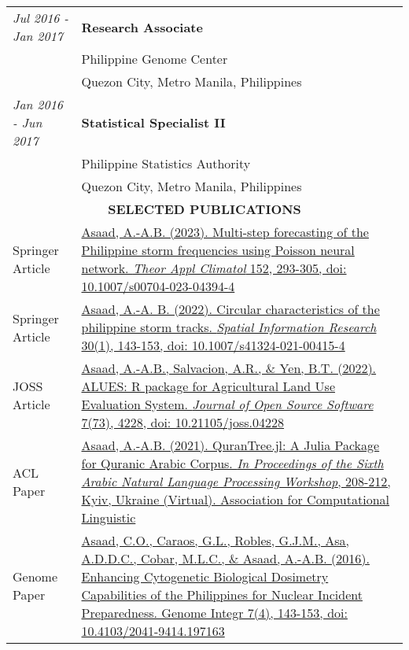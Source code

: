 \begin{tabular}{lp{10.3cm}}
    \textit{Jul 2016 - Jan 2017}& \textbf{Research Associate}\\
    & Philippine Genome Center\\
    & Quezon City, Metro Manila, Philippines\\[0.5cm]

    \textit{Jan 2016 - Jun 2017}& \textbf{Statistical Specialist II}\\
    & Philippine Statistics Authority\\
    & Quezon City, Metro Manila, Philippines\\[0.7cm]
    \multicolumn{2}{c}{\bf SELECTED PUBLICATIONS}\\[0.3cm]
    Springer Article&\href{https://rdcu.be/c6olI}{Asaad, A.-A.B. (2023). Multi-step forecasting of the Philippine storm frequencies using Poisson neural network. \textit{Theor Appl Climatol} 152, 293-305, doi: 10.1007/s00704-023-04394-4}\\[2cm]
    Springer Article&\href{https://rdcu.be/cztsX}{Asaad, A.-A. B. (2022). Circular characteristics of the philippine storm tracks. \textit{Spatial Information Research} 30(1), 143-153, doi: 10.1007/s41324-021-00415-4}\\[2cm]
    JOSS Article&\href{https://joss.theoj.org/papers/10.21105/joss.04228}{Asaad, A.-A.B., Salvacion, A.R., \& Yen, B.T. (2022). ALUES: R package for Agricultural Land Use Evaluation System. \textit{Journal of Open Source Software} 7(73), 4228, doi: 10.21105/joss.04228}\\[2cm]
    ACL Paper&\href{https://aclanthology.org/2021.wanlp-1.22/}{Asaad, A.-A.B. (2021). QuranTree.jl: A Julia Package for Quranic Arabic Corpus. \textit{In Proceedings of the Sixth Arabic Natural Language Processing Workshop}, 208-212,  Kyiv, Ukraine (Virtual). Association for Computational Linguistic}\\[2cm]
    Genome Paper&\href{https://www.ncbi.nlm.nih.gov/pmc/articles/PMC5292908/}{Asaad, C.O., Caraos, G.L., Robles, G.J.M., Asa, A.D.D.C., Cobar, M.L.C., \& Asaad, A.-A.B. (2016). Enhancing Cytogenetic Biological Dosimetry Capabilities of the Philippines for Nuclear Incident Preparedness. Genome Integr 7(4), 143-153, doi: 10.4103/2041-9414.197163}
\end{tabular}
